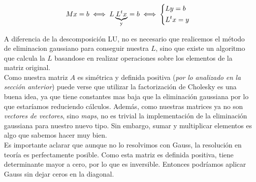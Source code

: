 \begin{center}
\[
M x = b \iff L \underbrace{L^t x}_{\text{y}} = b \iff
\begin{dcases}
    L y = b \\
    L^t x = y
\end{dcases}
\]
\end{center}

A diferencia de la descomposición LU, no es necesario que realicemos el método de eliminacion gaussiano para conseguir nuestra $L$, sino que existe un algoritmo que calcula la $L$ basandose en realizar operaciones sobre los elementos de la matriz original. \\

Como nuestra matriz $A$ es simétrica y definida positiva (\textit{por lo analizado en la sección anterior}) puede verse que utilizar la factorización de Cholesky es una buena idea, ya que tiene constantes mas baja que la eliminación gaussiana por lo que estaríamos reduciendo cálculos. Además, como nuestras matrices ya no son \textit{vectores de vectores}, sino \textit{maps},  no es trivial la implementación de la eliminación gaussiana para nuestro nuevo tipo. Sin embargo, sumar y multiplicar elementos es algo que sabemos hacer muy bien. \\

Es importante aclarar que aunque no lo resolvimos con Gauss, la resolución en teoría es perfectamente posible. Como esta matriz es definida positiva, tiene determinante mayor a cero, por lo que es inversible. Entonces podríamos aplicar Gauss sin dejar ceros en la diagonal.
